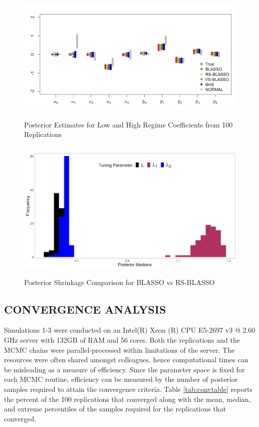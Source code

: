 \begin{figure}[!h]
	\centering
	      \caption{Posterior Estimates for Low and High Regime Coefficients from 100 Replications}
      \includegraphics[scale=0.3]{blassovsbhs4}
      \label{fig:blvsbh4}
\end{figure}

\begin{figure}[!h]
	\centering
	      \caption{Posterior Shrinkage Comparison for BLASSO vs RS-BLASSO}
      \includegraphics[scale=0.30]{rslambda}
      \label{fig:lambdabox}
\end{figure}

\vskip 3mm

\subsection{CONVERGENCE ANALYSIS}

Simulations 1-3 were conducted on an Intel(R) Xeon (R) CPU E5-2697 v3 @ 2.60 GHz server with 132GB of RAM and 56 cores. Both the replications and the MCMC chains were parallel-processed within limitations of the server. The resources were often shared amongst colleagues, hence computational times can be misleading as a measure of efficiency. Since the parameter space is fixed for each MCMC routine, efficiency can be measured by the number of posterior samples required to attain the convergence criteria. Table \ref{tab:convtable} reports the percent of the 100 replications that converged along with the mean, median, and extreme percentiles of the samples required for the replications that converged.

